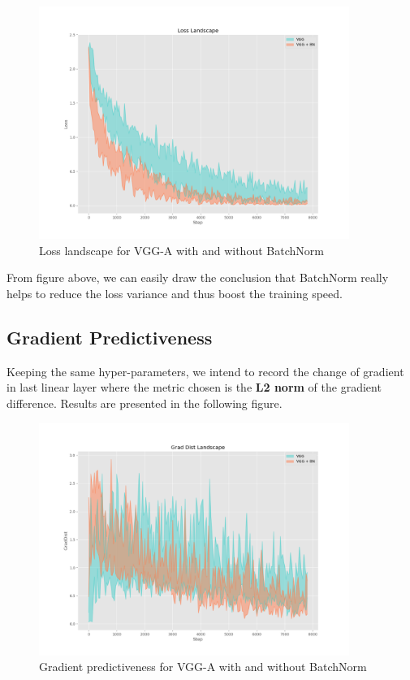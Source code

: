 \documentclass[a4paper, 11pt]{article} %
\begin{document}
\begin{figure}[H]
	\centering
	\includegraphics[width=0.9\textwidth]{./img/loss-lands.png}
	\caption{Loss landscape for VGG-A with and without BatchNorm}
\end{figure}

From figure above, we can easily draw the conclusion that BatchNorm really helps to reduce
the loss variance and thus boost the training speed.

\subsection{\textbf{Gradient Predictiveness}}

Keeping the same hyper-parameters, we intend to record the change of gradient in last linear
layer where the metric chosen is the \textbf{L2 norm} of the gradient difference. Results
are presented in the following figure.

\begin{figure}[H]
	\centering
	\includegraphics[width=0.9\textwidth]{./img/grad-lands.png}
	\caption{Gradient predictiveness for VGG-A with and without BatchNorm}
\end{figure}
\end{document}
